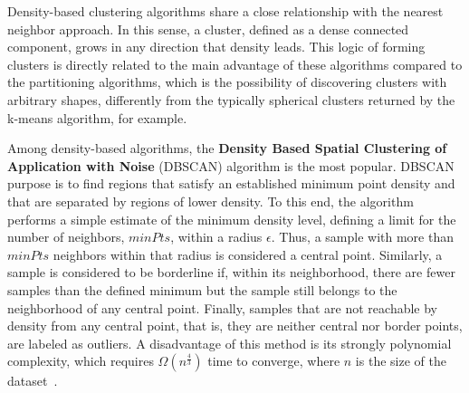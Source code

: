 \documentclass{ieeeaccess}
\begin{document}
Density-based clustering algorithms share a close relationship with the nearest neighbor approach. In this sense, a cluster, defined as a dense connected  component, grows in any direction that density leads. This logic of forming clusters is directly related to the main advantage of these algorithms compared to the partitioning algorithms, which is the possibility of discovering clusters with arbitrary shapes, differently from the typically spherical clusters returned by the k-means algorithm, for example.



Among density-based algorithms, the \textbf{Density Based Spatial Clustering of Application with Noise} (DBSCAN) algorithm is the most popular. DBSCAN purpose is to find regions that satisfy an established minimum point density and that are separated by regions of lower density. To this end, the algorithm performs a simple estimate of the minimum density level, defining a limit for the number of neighbors, $ minPts $, within a radius $ \epsilon $. Thus, a sample with more than $ minPts $ neighbors within that radius is considered a central point. Similarly, a sample is considered to be borderline if, within its neighborhood, there are fewer samples than the defined minimum but the sample still belongs to the neighborhood of any central point. Finally, samples that are not reachable by density from any central point, that is, they are neither central nor border points, are labeled as outliers. A disadvantage of this method is its strongly polynomial complexity, which requires $ \Omega \left(n ^ {\frac {4} {3}}\right) $ time to converge, where $ n $ is the size of the dataset~\cite{fahad2014survey, gan2015dbscan, schubert2017dbscan}.
\end{document}
